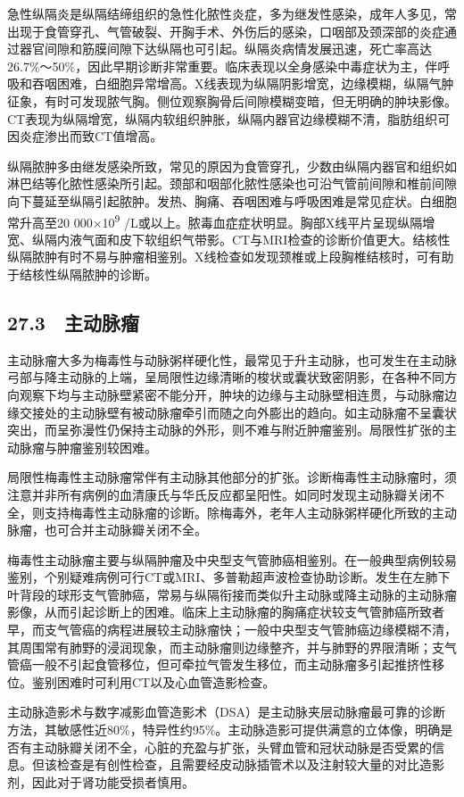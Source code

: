 急性纵隔炎是纵隔结缔组织的急性化脓性炎症，多为继发性感染，成年人多见，常出现于食管穿孔、气管破裂、开胸手术、外伤后的感染，口咽部及颈深部的炎症通过器官间隙和筋膜间隙下达纵隔也可引起。纵隔炎病情发展迅速，死亡率高达26.7\%～50\%，因此早期诊断非常重要。临床表现以全身感染中毒症状为主，伴呼吸和吞咽困难，白细胞异常增高。X线表现为纵隔阴影增宽，边缘模糊，纵隔气肿征象，有时可发现脓气胸。侧位观察胸骨后间隙模糊变暗，但无明确的肿块影像。CT表现为纵隔增宽，纵隔内软组织肿胀，纵隔内器官边缘模糊不清，脂肪组织可因炎症渗出而致CT值增高。

纵隔脓肿多由继发感染所致，常见的原因为食管穿孔，少数由纵隔内器官和组织如淋巴结等化脓性感染所引起。颈部和咽部化脓性感染也可沿气管前间隙和椎前间隙向下蔓延至纵隔引起脓肿。发热、胸痛、吞咽困难与呼吸困难是常见症状。白细胞常升高至20
000×10\textsuperscript{9}
/L或以上。脓毒血症症状明显。胸部X线平片呈现纵隔增宽、纵隔内液气面和皮下软组织气带影。CT与MRI检查的诊断价值更大。结核性纵隔脓肿有时不易与肿瘤相鉴别。X线检查如发现颈椎或上段胸椎结核时，可有助于结核性纵隔脓肿的诊断。

\subsection{27.3　主动脉瘤}

主动脉瘤大多为梅毒性与动脉粥样硬化性，最常见于升主动脉，也可发生在主动脉弓部与降主动脉的上端，呈局限性边缘清晰的梭状或囊状致密阴影，在各种不同方向观察下均与主动脉壁紧密不能分开，肿块的边缘与主动脉壁相连贯，与动脉瘤边缘交接处的主动脉壁有被动脉瘤牵引而随之向外膨出的趋向。如主动脉瘤不呈囊状突出，而呈弥漫性仍保持主动脉的外形，则不难与附近肿瘤鉴别。局限性扩张的主动脉瘤与肿瘤鉴别较困难。

局限性梅毒性主动脉瘤常伴有主动脉其他部分的扩张。诊断梅毒性主动脉瘤时，须注意并非所有病例的血清康氏与华氏反应都呈阳性。如同时发现主动脉瓣关闭不全，则支持梅毒性主动脉瘤的诊断。除梅毒外，老年人主动脉粥样硬化所致的主动脉瘤，也可合并主动脉瓣关闭不全。

梅毒性主动脉瘤主要与纵隔肿瘤及中央型支气管肺癌相鉴别。在一般典型病例较易鉴别，个别疑难病例可行CT或MRI、多普勒超声波检查协助诊断。发生在左肺下叶背段的球形支气管肺癌，常易与纵隔衔接而类似升主动脉或降主动脉的主动脉瘤影像，从而引起诊断上的困难。临床上主动脉瘤的胸痛症状较支气管肺癌所致者早，而支气管癌的病程进展较主动脉瘤快；一般中央型支气管肺癌边缘模糊不清，其周围常有肺野的浸润现象，而主动脉瘤则边缘整齐，并与肺野的界限清晰；支气管癌一般不引起食管移位，但可牵拉气管发生移位，而主动脉瘤多引起推挤性移位。鉴别困难时可利用CT以及心血管造影检查。

主动脉造影术与数字减影血管造影术（DSA）是主动脉夹层动脉瘤最可靠的诊断方法，其敏感性近80\%，特异性约95\%。主动脉造影可提供满意的立体像，明确是否有主动脉瓣关闭不全，心脏的充盈与扩张，头臂血管和冠状动脉是否受累的信息。但该检查是有创性检查，且需要经皮动脉插管术以及注射较大量的对比造影剂，因此对于肾功能受损者慎用。

